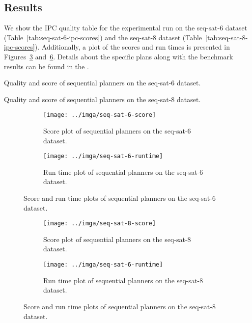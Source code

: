 \subsection{Results}\label{sequential-results}

We show the IPC quality table
for the experimental run on the seq-sat-6 dataset (Table~\ref{tab:seq-sat-6-ipc-scores})
and the seq-sat-8 dataset (Table~\ref{tab:seq-sat-8-ipc-scores}).
Additionally, a plot of the scores and run times is presented in Figures~\ref{fig:seq-sat-6-plots} and~\ref{fig:seq-sat-8-plots}. Details about the specific plans along with the benchmark results can be found in the .

\begin{table}
\centering

\caption{Quality and score of sequential planners on the seq-sat-6 dataset.}
\label{tab:seq-sat-6-ipc-scores}
\end{table}

\begin{table}
\centering

\caption{Quality and score of sequential planners on the seq-sat-8 dataset.}
\label{tab:seq-sat-8-ipc-scores}
\end{table}

\begin{figure}
\centering
\begin{subfigure}{\textwidth}
\centering
\texttt{[image: ../imga/seq-sat-6-score]}
\caption{Score plot of sequential planners on the seq-sat-6 dataset.}
\label{fig:seq-sat-6-score}
\end{subfigure}

\begin{subfigure}{\textwidth}
\centering
\texttt{[image: ../imga/seq-sat-6-runtime]}
\caption{Run time plot of sequential planners on the seq-sat-6 dataset.}
\label{fig:seq-sat-6-runtime}
\end{subfigure}
\caption{Score and run time plots of sequential planners on the seq-sat-6 dataset.}
\label{fig:seq-sat-6-plots}
\end{figure}

\begin{figure}
\centering
\begin{subfigure}{\textwidth}
\centering
\texttt{[image: ../imga/seq-sat-8-score]}
\caption{Score plot of sequential planners on the seq-sat-8 dataset.}
\label{fig:seq-sat-8-score}
\end{subfigure}

\begin{subfigure}{\textwidth}
\centering
\texttt{[image: ../imga/seq-sat-6-runtime]}
\caption{Run time plot of sequential planners on the seq-sat-8 dataset.}
\label{fig:seq-sat-8-runtime}
\end{subfigure}
\caption{Score and run time plots of sequential planners on the seq-sat-8 dataset.}
\label{fig:seq-sat-8-plots}
\end{figure}


